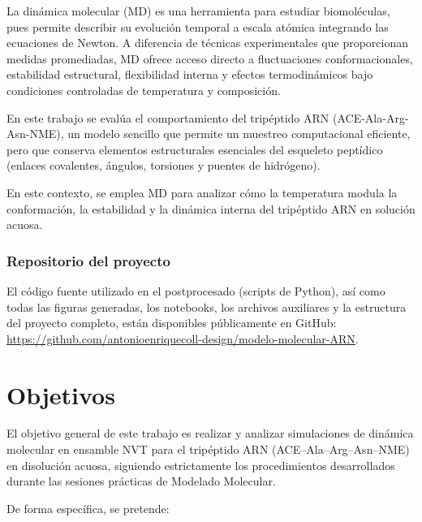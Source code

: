 \documentclass[12pt,a4paper]{article}
\begin{document}
La dinámica molecular (MD) es una herramienta para estudiar biomoléculas, pues permite describir su evolución temporal a escala atómica integrando las ecuaciones de Newton. A diferencia de técnicas experimentales que proporcionan medidas promediadas, MD ofrece acceso directo a fluctuaciones conformacionales, estabilidad estructural, flexibilidad interna y efectos termodinámicos bajo condiciones controladas de temperatura y composición.

En este trabajo se evalúa el comportamiento del tripéptido ARN (ACE-Ala-Arg-Asn-NME), un modelo sencillo que permite un muestreo computacional eficiente, pero que conserva elementos estructurales esenciales del esqueleto peptídico (enlaces covalentes, ángulos, torsiones y puentes de hidrógeno).

En este contexto, se emplea MD para analizar cómo la temperatura modula la conformación, la estabilidad y la dinámica interna del tripéptido ARN en solución acuosa.

\subsubsection*{Repositorio del proyecto}
El código fuente utilizado en el postprocesado (scripts de Python), así como todas
las figuras generadas, los notebooks, los archivos auxiliares y la estructura del
proyecto completo, están disponibles públicamente en GitHub:
\url{https://github.com/antonioenriquecoll-design/modelo-molecular-ARN}.

\section{Objetivos}
El objetivo general de este trabajo es realizar y analizar simulaciones de dinámica molecular en ensamble NVT para el tripéptido ARN (ACE–Ala–Arg–Asn–NME) en disolución acuosa, siguiendo estrictamente los procedimientos desarrollados durante las sesiones prácticas de Modelado Molecular.

De forma específica, se pretende:
\end{document}
